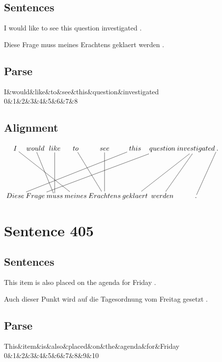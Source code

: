 \documentclass{report}
\begin{document}
\subsection*{Sentences}
I would like to see this question investigated .

\noindent Diese Frage muss meines Erachtens geklaert werden .



\subsection*{Parse}
\begin{dependency}[theme=simple]
\begin{deptext}[column sep=.5cm, row sep=.1ex]
I\&would\&like\&to\&see\&this\&question\&investigated\\
0\&1\&2\&3\&4\&5\&6\&7\&8\\
\end{deptext}
\end{dependency}


\subsection*{Alignment}
\scriptsize{
$
\xymatrix@C-2.3pc{
I \ar @{-} [ddrrr] & would \ar @{-} [ddr] & like \ar @{-} [dd] & to \ar @{-} [ddr] & see \ar @{-} [dd] & this \ar @{-} [ddlllll] & question \ar @{-} [ddlllll] & investigated \ar @{-} [ddll] \ar @{-} [ddl] & . \ar @{-} [ddl]\\\\
Diese & Frage & muss & meines & Erachtens & geklaert & werden & .
}$}
\newpage\section*{Sentence 405}

\subsection*{Sentences}
This item is also placed on the agenda for Friday .

\noindent Auch dieser Punkt wird auf die Tagesordnung vom Freitag gesetzt .



\subsection*{Parse}
\begin{dependency}[theme=simple]
\begin{deptext}[column sep=.5cm, row sep=.1ex]
This\&item\&is\&also\&placed\&on\&the\&agenda\&for\&Friday\\
0\&1\&2\&3\&4\&5\&6\&7\&8\&9\&10\\
\end{deptext}
\end{dependency}
\end{document}
